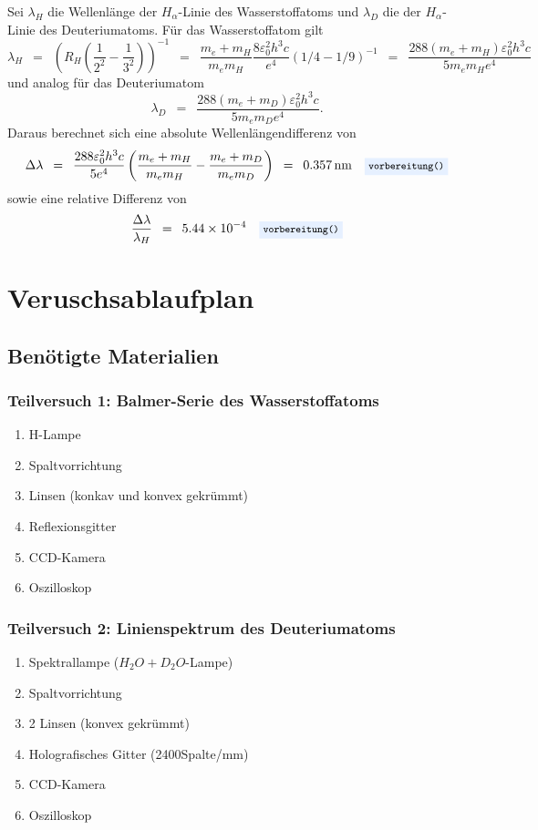 \documentclass{article}
\newcommand{\widespace}{\enspace}
\newcommand{\wideeq}{\widespace = \widespace}
\newcommand{\coderef}[1]{%
    \text{\footnotesize \colorbox{codebg}{\texttt{#1()}}}%
}
\begin{document}
Sei $\lambda_H$ die Wellenlänge der $H_\alpha$-Linie des Wasserstoffatoms
und $\lambda_D$ die der $H_\alpha$-Linie des Deuteriumatoms.
Für das Wasserstoffatom gilt
\[
    \lambda_H \wideeq \left(
        R_H \left( \frac{1}{2^2} - \frac{1}{3^2} \right)
    \right)^{-1}
    \wideeq \frac{m_e + m_H}{m_e m_H} \frac{8 \varepsilon_0^2 h^3 c}{e^4}
    \left( 1/4 - 1/9 \right)^{-1}
    \wideeq \frac{288 (m_e + m_H) \varepsilon_0^2 h^3 c}{5 m_e m_H e^4}
\]
und analog für das Deuteriumatom
\[
    \lambda_D \wideeq \frac{288 (m_e + m_D) \varepsilon_0^2 h^3 c}{5 m_e m_D e^4}.
\]
Daraus berechnet sich eine absolute Wellenlängendifferenz von
\[
    \Delta \lambda
    \wideeq \frac{288 \varepsilon_0^2 h^3 c}{5 e^4}
    \left(
        \frac{m_e + m_H}{m_e m_H} - \frac{m_e + m_D}{m_e m_D}
    \right)
    \wideeq \qty{0.357}{\nm} \quad \coderef{vorbereitung}
\]
sowie eine relative Differenz von
\[
    \frac{\Delta \lambda}{\lambda_H} \wideeq \num{5.44e-4}
    \quad \coderef{vorbereitung}
\]

\newpage

\section{Veruschsablaufplan}

\subsection{Benötigte Materialien}
\subsubsection{Teilversuch 1: Balmer-Serie des Wasserstoffatoms}
    \begin{enumerate}[label=\arabic*.]
        \item H-Lampe
        \item Spaltvorrichtung
        \item Linsen (konkav und konvex gekrümmt)
        \item Reflexionsgitter
        \item CCD-Kamera
        \item Oszilloskop
    \end{enumerate}
\subsubsection{Teilversuch 2: Linienspektrum des Deuteriumatoms}
    \begin{enumerate}[label=\arabic*.]
        \item Spektrallampe ($H_2O+D_2O$-Lampe)
        \item Spaltvorrichtung
        \item 2 Linsen (konvex gekrümmt)
        \item Holografisches Gitter (2400Spalte/mm)
        \item CCD-Kamera
        \item Oszilloskop
    \end{enumerate}
\end{document}
